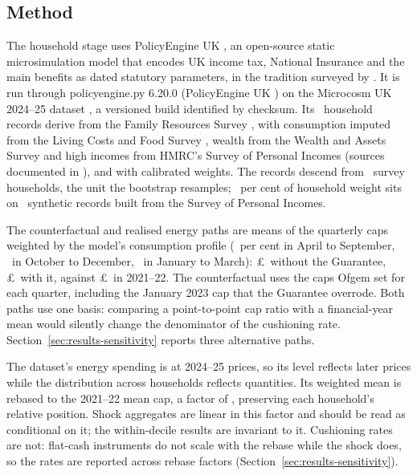 \subsection{Method}\label{sec:secondstage-method}

The household stage uses PolicyEngine UK \citep{policyengineuk}, an
open-source static microsimulation model that encodes UK income tax,
National Insurance and the main benefits as dated statutory
parameters, in the tradition surveyed by \citet{figari2015}. It is run
through policyengine.py 6.20.0 (PolicyEngine UK
\SsPolicyEngineVersion) on the Microcosm UK 2024--25 dataset
\citep{microcosmuk}, a versioned build identified by
checksum. Its \SsHouseholdsRecords\ household records derive from the
Family Resources Survey \citep{frs}, with consumption imputed from the
Living Costs and Food Survey \citep[LCFS;][]{lcfs}, wealth from the
Wealth and Assets Survey and high incomes from HMRC's Survey of
Personal Incomes (sources documented in \citealt{microcosmuk}), and with calibrated weights. The records descend from
\DataSourceHouseholds\ survey households, the unit the bootstrap
resamples; \SsNoSynWeightSharePct\ per cent of household weight sits
on \DataSyntheticRecords\ synthetic records built from the Survey of
Personal Incomes.

 The counterfactual and realised energy paths are
means of the quarterly caps weighted by the model's consumption
profile (\SsFyWeightAprSepPct\ per cent in April to September,
\SsFyWeightOctDecPct\ in October to December, \SsSeasShareJanMarPct\ in
January to March): \pounds\SsCounterFyCap\ without the Guarantee,
\pounds\SsRealisedFyCap\ with it, against \pounds\SsBaseFyCap\ in
2021--22. The counterfactual uses the caps Ofgem set for each quarter,
including the January 2023 cap that the Guarantee overrode. Both paths
use one basis: comparing a point-to-point cap ratio with a
financial-year mean would silently change the denominator of the
cushioning rate. Section~\ref{sec:results-sensitivity} reports three
alternative paths.

 The dataset's energy spending is at 2024--25 prices,
so its level reflects later prices while the distribution across
households reflects quantities. Its weighted mean is rebased to the 2021--22 mean cap, a factor of
\SsRebaseFactor, preserving each household's relative position. Shock
aggregates are linear in this factor and should be read as conditional
on it; the within-decile results are invariant to it. Cushioning rates are not: flat-cash instruments do
not scale with the rebase while the shock does, so the rates are
reported across rebase factors (Section~\ref{sec:results-sensitivity}).

